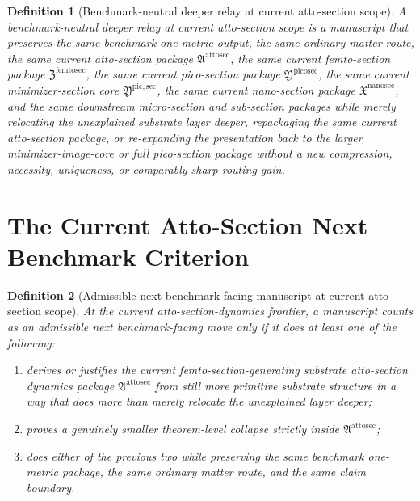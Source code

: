 \documentclass[11pt]{article}
\newcommand{\NanoSectionPackage}{\mathfrak X^{\mathrm{nanosec}}}
\newcommand{\PicoSectionPackage}{\mathfrak Y^{\mathrm{picosec}}}
\newcommand{\PicoMinSectionCore}{\mathfrak Y^{\mathrm{pic,sec}}}
\newcommand{\FemtoSectionPackage}{\mathfrak Z^{\mathrm{femtosec}}}
\newcommand{\AttoSectionPackage}{\mathfrak A^{\mathrm{attosec}}}
\newtheorem{definition}{Definition}
\begin{document}
\begin{definition}[Benchmark-neutral deeper relay at current atto-section scope]
A \emph{benchmark-neutral deeper relay at current atto-section scope} is a manuscript that preserves the same benchmark one-metric output, the same ordinary matter route, the same current atto-section package \(\AttoSectionPackage\), the same current femto-section package \(\FemtoSectionPackage\), the same current pico-section package \(\PicoSectionPackage\), the same current minimizer-section core \(\PicoMinSectionCore\), the same current nano-section package \(\NanoSectionPackage\), and the same downstream micro-section and sub-section packages while merely relocating the unexplained substrate layer deeper, repackaging the same current atto-section package, or re-expanding the presentation back to the larger minimizer-image-core or full pico-section package without a new compression, necessity, uniqueness, or comparably sharp routing gain.
\end{definition}

\section{The Current Atto-Section Next Benchmark Criterion}

\begin{definition}[Admissible next benchmark-facing manuscript at current atto-section scope]
At the current atto-section-dynamics frontier, a manuscript counts as an admissible next benchmark-facing move only if it does at least one of the following:
\begin{enumerate}
    \item derives or justifies the current femto-section-generating substrate atto-section dynamics package \(\AttoSectionPackage\) from still more primitive substrate structure in a way that does more than merely relocate the unexplained layer deeper;
    \item proves a genuinely smaller theorem-level collapse strictly inside \(\AttoSectionPackage\);
    \item does either of the previous two while preserving the same benchmark one-metric package, the same ordinary matter route, and the same claim boundary.
\end{enumerate}
\end{definition}
\end{document}
